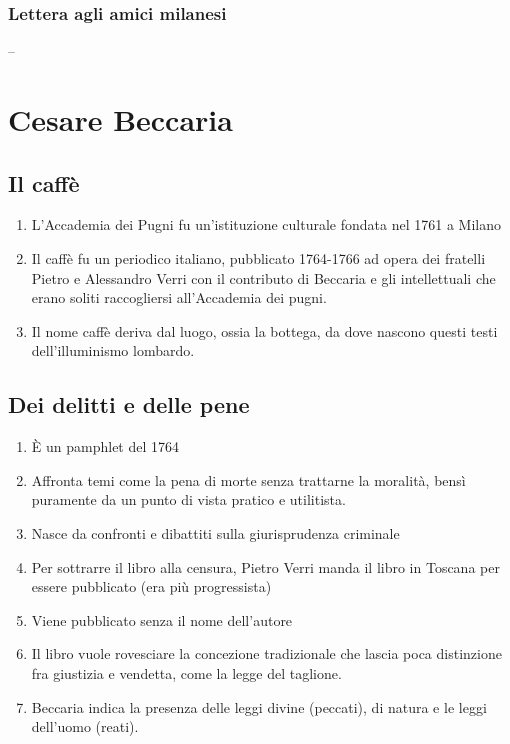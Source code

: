 \documentclass{article}
\begin{document}
\subsubsection{Lettera agli amici milanesi}

--

\newpage
\section{Cesare Beccaria}

\subsection{Il caffè}

\begin{enumerate}
    \item L'Accademia dei Pugni fu un'istituzione culturale fondata nel 1761 a Milano
    \item Il caffè fu un periodico italiano, pubblicato 1764-1766 ad opera dei fratelli Pietro e Alessandro Verri con il contributo di Beccaria e gli intellettuali che erano soliti raccogliersi all'Accademia dei pugni.
    \item Il nome caffè deriva dal luogo, ossia la bottega, da dove nascono questi testi dell'illuminismo lombardo.
\end{enumerate}

\subsection{Dei delitti e delle pene}

\begin{enumerate}
    \item È un pamphlet del 1764
    \item Affronta temi come la pena di morte senza trattarne la moralità, bensì puramente da un punto di vista pratico e utilitista.
    \item Nasce da confronti e dibattiti sulla giurisprudenza criminale
    \item Per sottrarre il libro alla censura, Pietro Verri manda il libro in Toscana per essere pubblicato (era più progressista)
    \item Viene pubblicato senza il nome dell'autore
    \item Il libro vuole rovesciare la concezione tradizionale che lascia poca distinzione fra giustizia e vendetta, come la legge del taglione.
    \item Beccaria indica la presenza delle leggi divine (peccati), di natura e le leggi dell'uomo (reati).
\end{enumerate}
\end{document}
